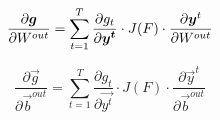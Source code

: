 \begin{equation}
\frac{\partial \boldsymbol{g}}{\partial W^{out}} = \sum_{t=1}^T \frac{\partial g_t}{\partial \boldsymbol{y^t}} \cdot J(F) \cdot \frac{\partial \boldsymbol{y}^t}{\partial W^{out}} 
\end{equation}

\begin{equation}
\frac{\partial \vec{g}}{\partial \vec{b}^{out}} = \sum_{t=1}^T \frac{\partial g_t}{\partial \vec{y^t}} \cdot J(F) \cdot \frac{\partial \vec{y}^t}{\partial \vec{b}^{out}} 
\end{equation}







